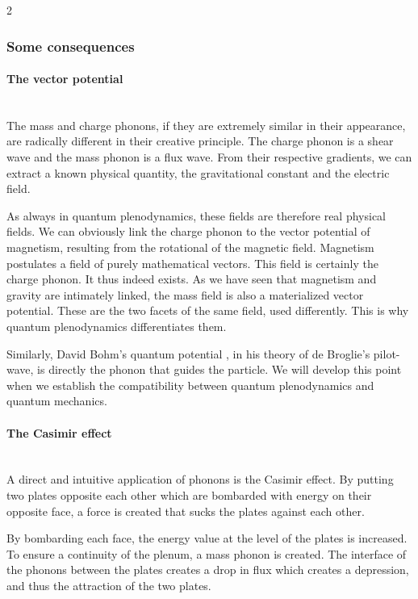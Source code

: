 \begin{multicols}{2}
	\subsubsection{Some consequences}
	
	\paragraph{The vector potential}~\\ 
	
	The mass and charge phonons, if they are extremely similar in their 
	appearance, are radically different in their creative principle. The 
	charge phonon is a shear wave and the mass phonon is a flux wave. From 
	their respective gradients, we can extract a known physical quantity, 
	the gravitational constant and the electric field.
	
	As always in quantum plenodynamics, these fields are therefore real 
	physical fields. We can obviously link the charge phonon to the vector 
	potential of magnetism, resulting from the rotational of the magnetic 
	field. Magnetism postulates a field of purely mathematical vectors. 
	This field is certainly the charge phonon. It thus indeed exists. As we 
	have seen that magnetism and gravity are intimately linked, the mass 
	field is also a materialized vector potential. These are the two facets 
	of the same field, used differently. This is why quantum 
	plenodynamics differentiates them.
	
	Similarly, David Bohm's quantum potential \cite{bohm1952suggested}, in his theory of 
	de Broglie's pilot-wave, is directly the phonon that guides the 
	particle. We will develop this point when we establish the compatibility 
	between quantum plenodynamics and quantum mechanics.
	
	\paragraph{The Casimir effect}~\\
	
	A direct and intuitive application of phonons is the Casimir effect. By 
	putting two plates opposite each other which are bombarded with energy 
	on their opposite face, a force is created that sucks the plates 
	against each other.
	
	By bombarding each face, the energy value at the level of the plates is 
	increased. To ensure a continuity of the plenum, a mass phonon is 
	created. The interface of the phonons between the plates creates a drop 
	in flux which creates a depression, and thus the attraction of the two 
	plates.
	

\end{multicols}
